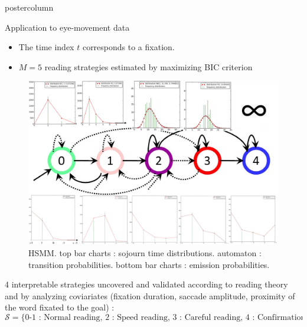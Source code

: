 \documentclass[final,hyperref={pdfpagelabels=false}]{beamer}
\begin{document}
\begin{frame}
\begin{columns}
\begin{column}{.50\textwidth}
\begin{beamercolorbox}[center,wd=\textwidth]{postercolumn}
\begin{minipage}[T]{.98\textwidth}
{            \vfill
            \begin{block}{Application to eye-movement data}
                \begin{itemize}
                    \item[\bullet] The time index $t$ corresponds to a fixation.
                    \item[\bullet] $M = 5$ reading strategies estimated by maximizing BIC criterion
                \end{itemize}
                \begin{figure}[h]
                    \centering
                    \includegraphics[width=31.67cm]{hsmm.jpg}
                    \caption{HSMM. top bar charts : sojourn time distributions.
                    automaton : transition probabilities.
                    bottom bar charts : emission probabilities.}
                \end{figure}
                4 interpretable strategies uncovered and validated according to reading theory and by analyzing coviariates
                (fixation duration, saccade amplitude, proximity of the word fixated to the goal) :
                {\small$$\mathcal{S}=\{\text{0-1 : Normal reading, 2 : Speed reading, 3 : Careful reading, 4 : Confirmation}\}$$}
                \begin{minipage}{0.47\textwidth}
                    \begin{figure}[h]

\end{figure}
\end{minipage}
\end{block}}
\end{minipage}
\end{beamercolorbox}
\end{column}
\end{columns}
\end{frame}
\end{document}
